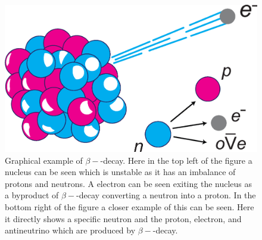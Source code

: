                 \begin{figure}
                    \centering
                    
                    \includegraphics[width=1.0\linewidth]{figures/background_beta_minus_decay.png}
                    
                    \captionsetup{singlelinecheck=false}
                    \caption{
                        Graphical example of $\beta-$-decay. Here in the top left of the figure a nucleus can be seen which is unstable as it has an imbalance of protons and neutrons. A electron can be seen exiting the nucleus as a byproduct of $\beta-$-decay converting a neutron into a proton. In the bottom right of the figure a closer example of this can be seen. Here it directly shows a specific neutron and the proton, electron, and antineutrino which are produced by $\beta-$-decay.
                    }
                    \label{fig:decay_and_annihilation_beta_minus_decay}
                \end{figure}
                
